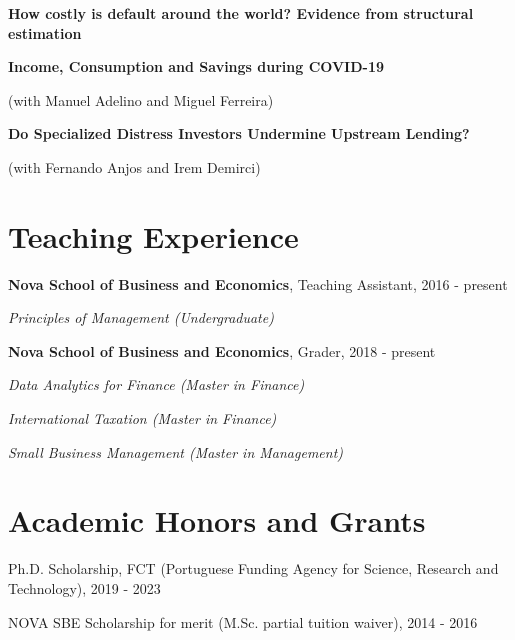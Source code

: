 \documentclass[letterpaper]{article}
\renewenvironment{itemize}{
  \begin{list}{}{
    \setlength{\leftmargin}{1.5em}
  }
}{
  \end{list}
}
\begin{document}
\begin{itemize}
\item \textbf{How costly is default around the world? Evidence from structural estimation}

\medskip

\item \textbf{Income, Consumption and Savings during COVID-19}

	(with Manuel Adelino and Miguel Ferreira)
\medskip
	
\item \textbf{Do Specialized Distress Investors Undermine Upstream Lending?}

	(with Fernando Anjos and Irem Demirci)

\end{itemize}

\section*{Teaching Experience}

\begin{itemize} 
\item \textbf{Nova School of Business and Economics}, Teaching Assistant, 2016 - present
\begin{itemize}
\item \textit{Principles of Management (Undergraduate)}
\smallskip
\end{itemize}
\item \textbf{Nova School of Business and Economics}, Grader, 2018 - present
\begin{itemize}
\item \textit{Data Analytics for Finance (Master in Finance)}
\item \textit{International Taxation (Master in Finance)}
\item \textit{Small Business Management (Master in Management)}
\end{itemize}
\end{itemize}

\section*{Academic Honors and Grants}

\begin{itemize}
\item Ph.D. Scholarship, FCT (Portuguese Funding Agency for Science, Research and Technology), 2019 - 2023
\item NOVA SBE Scholarship for merit (M.Sc. partial tuition waiver), 2014 - 2016
\end{itemize}
\end{document}
